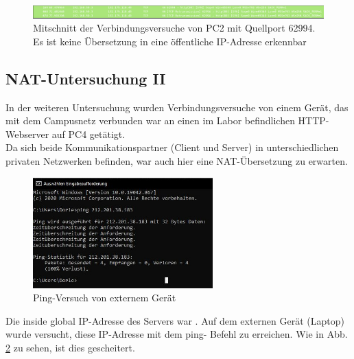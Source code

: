 \documentclass[11pt, a4paper]{article}
\begin{document}
\begin{figure}[H]
  \centering
  \includegraphics[width=\textwidth]
  {graphics/bilder/31/why}
  \caption{Mitschnitt der Verbindungsversuche von PC2 mit Quellport 62994.
  Es ist keine Übersetzung in eine öffentliche IP-Adresse erkennbar}\label{why}
\end{figure}


\subsection{NAT-Untersuchung II}

In der weiteren Untersuchung wurden Verbindungsversuche von einem Gerät, das
mit dem Campusnetz verbunden war an einen im Labor befindlichen HTTP-Webserver
auf PC4 getätigt.\\

Da sich beide Kommunikationspartner (Client und Server) in unterschiedlichen
privaten Netzwerken befinden, war auch hier eine NAT-Übersetzung zu erwarten.\\

\begin{figure}[H]
  \centering
  \includegraphics[width=0.618\textwidth]
  {graphics/bilder/32/ping_laptop}
  \caption{Ping-Versuch von externem Gerät}\label{ping_fail}
\end{figure}

Die inside global IP-Adresse des Servers war . Auf
dem externen Gerät (Laptop) wurde versucht, diese IP-Adresse mit dem ping-
Befehl zu erreichen. Wie in Abb. \ref{ping_fail} zu sehen, ist dies gescheitert.
\end{document}
